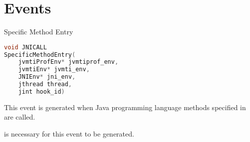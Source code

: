 
\section{Events}

\begin{apidef}{Specific Method Entry}
\begin{lstlisting}[language=C]
void JNICALL
SpecificMethodEntry(
    jvmtiProfEnv* jvmtiprof_env,
    jvmtiEnv* jvmti_env,
    JNIEnv* jni_env,
    jthread thread,
    jint hook_id)
\end{lstlisting}

\begin{apidesc}
This event is generated when Java programming language methods specified in  are called.
\end{apidesc}

\begin{apiphase}
\eventphaselive
\end{apiphase}

\begin{eventtype}
\end{eventtype}

\begin{apicap}
 is necessary for this event to be generated.
\end{apicap}

\begin{apiparam}
\end{apiparam}
\end{apidef}

